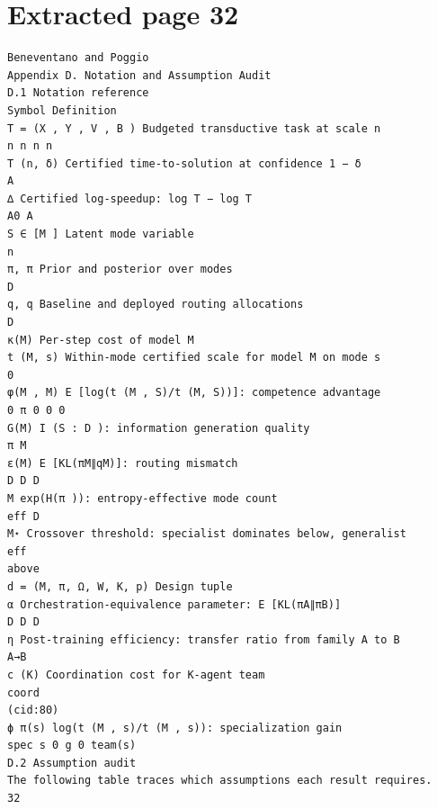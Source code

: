 \documentclass[11pt]{article}
\begin{document}
\clearpage
\section*{Extracted page 32}
\begin{verbatim}
Beneventano and Poggio
Appendix D. Notation and Assumption Audit
D.1 Notation reference
Symbol Definition
T = (X , Y , V , B ) Budgeted transductive task at scale n
n n n n
T (n, δ) Certified time-to-solution at confidence 1 − δ
A
∆ Certified log-speedup: log T − log T
A0 A
S ∈ [M ] Latent mode variable
n
π, π Prior and posterior over modes
D
q, q Baseline and deployed routing allocations
D
κ(M) Per-step cost of model M
t (M, s) Within-mode certified scale for model M on mode s
0
φ(M , M) E [log(t (M , S)/t (M, S))]: competence advantage
0 π 0 0 0
G(M) I (S : D ): information generation quality
π M
ε(M) E [KL(πM∥qM)]: routing mismatch
D D D
M exp(H(π )): entropy-effective mode count
eff D
M⋆ Crossover threshold: specialist dominates below, generalist
eff
above
d = (M, π, Ω, W, K, p) Design tuple
α Orchestration-equivalence parameter: E [KL(πA∥πB)]
D D D
η Post-training efficiency: transfer ratio from family A to B
A→B
c (K) Coordination cost for K-agent team
coord
(cid:80)
ϕ π(s) log(t (M , s)/t (M , s)): specialization gain
spec s 0 g 0 team(s)
D.2 Assumption audit
The following table traces which assumptions each result requires.
32
\end{verbatim}

\clearpage
\end{document}
